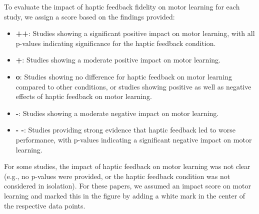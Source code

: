 To evaluate the impact of haptic feedback fidelity on motor learning for each study, we assign a score based on the findings provided:

\begin{itemize}
\item \textbf{++}: Studies showing a significant positive impact on motor learning, with all p-values indicating significance for the haptic feedback condition.
\item \textbf{+}: Studies showing a moderate positive impact on motor learning.
\item \textbf{o}: Studies showing no difference for haptic feedback on motor learning compared to other conditions, or studies showing positive as well as negative effects of haptic feedback on motor learning.
\item \textbf{-}: Studies showing a moderate negative impact on motor learning.
\item \textbf{-\hspace{-2mm} -}: Studies providing strong evidence that haptic feedback led to worse performance, with p-values indicating a significant negative impact on motor learning.
\end{itemize}

For some studies, the impact of haptic feedback on motor learning was not clear (e.g., no p-values were provided, or the haptic feedback condition was not considered in isolation). For these papers, we assumed an impact score on motor learning and marked this in the figure by adding a white mark in the center of the respective data points.
